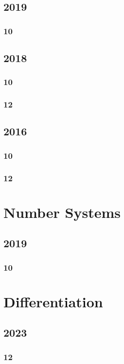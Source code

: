 \documentclass[11pt]{book}
\begin{document}
\section{2019}
\subsection{10}

\section{2018}
\subsection{10}

\subsection{12}

\section{2016}
\subsection{10}

\subsection{12}



\chapter{Number Systems}
\section{2019}
\subsection{10}




\chapter{Differentiation}
\section{2023}
\subsection{12}

\end{document}
